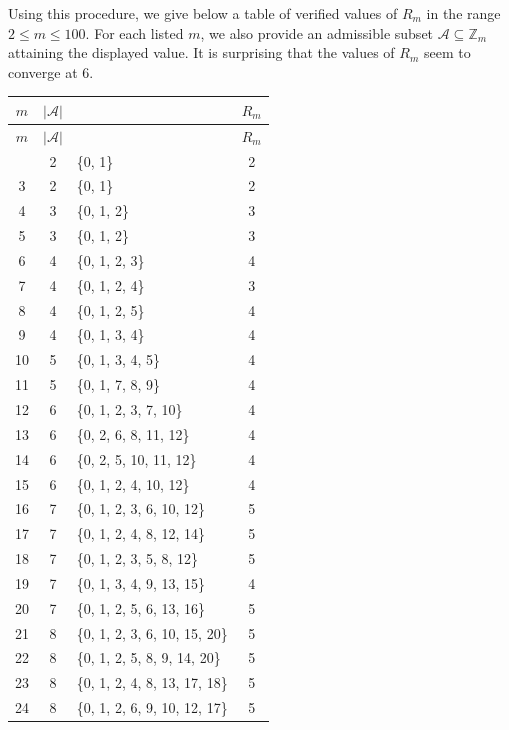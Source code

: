 \documentclass[12pt,a4paper,reqno]{amsart}
\numberwithin{equation}{section}
\newcommand{\card}[1]{\left|#1\right|}
\theoremstyle{plain}
\theoremstyle{definition}
\begin{document}
Using this procedure, we give below a table of verified values of
\(R_m\) in the range \(2\le m\le100\).  For each listed \(m\), we also provide an
admissible subset \(\mathcal{A}\subseteq\mathbb{Z}_m\) attaining the displayed value.
It is surprising that the values of \(R_m\) seem to converge at \(6\).
\medskip
\begingroup
\small
\setlength{\tabcolsep}{4pt}
\renewcommand{\arraystretch}{1.1}
\setlength{\LTleft}{0pt plus 1fill}
\setlength{\LTright}{0pt plus 1fill}
\begin{longtable}{c|c|>{\raggedright\arraybackslash}p{}|c}
\hline
\(m\) & \(\card{\mathcal{A}}\) & \multicolumn{1}{c|}{\(\mathcal{A}\)}  & \(R_m\) \\
\hline
\endfirsthead
\hline
\(m\) & \(\card{\mathcal{A}}\) & \multicolumn{1}{c|}{\(\mathcal{A}\)}  & \(R_m\) \\
\hline
\endhead
\hline
\endfoot
\hline
\endlastfoot
2 & 2 & \{0, 1\} & 2\\
3 & 2 & \{0, 1\} & 2\\
4 & 3 & \{0, 1, 2\} & 3\\
5 & 3 & \{0, 1, 2\} & 3\\
6 & 4 & \{0, 1, 2, 3\} & 4\\
7 & 4 & \{0, 1, 2, 4\} & 3\\
8 & 4 & \{0, 1, 2, 5\} & 4\\
9 & 4 & \{0, 1, 3, 4\} & 4\\
10 & 5 & \{0, 1, 3, 4, 5\} & 4\\
11 & 5 & \{0, 1, 7, 8, 9\} & 4\\
12 & 6 & \{0, 1, 2, 3, 7, 10\} & 4\\
13 & 6 & \{0, 2, 6, 8, 11, 12\} & 4\\
14 & 6 & \{0, 2, 5, 10, 11, 12\} & 4\\
15 & 6 & \{0, 1, 2, 4, 10, 12\} & 4\\
16 & 7 & \{0, 1, 2, 3, 6, 10, 12\} & 5\\
17 & 7 & \{0, 1, 2, 4, 8, 12, 14\} & 5\\
18 & 7 & \{0, 1, 2, 3, 5, 8, 12\} & 5\\
19 & 7 & \{0, 1, 3, 4, 9, 13, 15\} & 4\\
20 & 7 & \{0, 1, 2, 5, 6, 13, 16\} & 5\\
21 & 8 & \{0, 1, 2, 3, 6, 10, 15, 20\} & 5\\
22 & 8 & \{0, 1, 2, 5, 8, 9, 14, 20\} & 5\\
23 & 8 & \{0, 1, 2, 4, 8, 13, 17, 18\} & 5\\
24 & 8 & \{0, 1, 2, 6, 9, 10, 12, 17\} & 5\\

\end{longtable}
\end{document}

